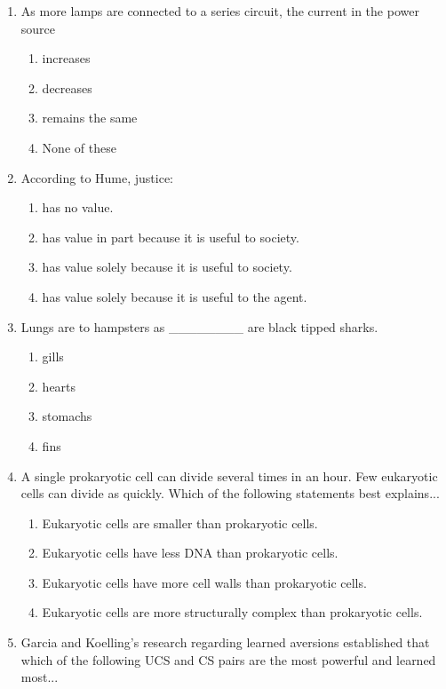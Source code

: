 \documentclass[12pt]{article}
\begin{document}
\begin{enumerate}[label=\arabic*.]
\begin{enumerate}[label=(\alph*)]
\end{enumerate}
\item As more lamps are connected to a series circuit, the current in the power source
\begin{enumerate}[label=(\alph*)]
    \item increases
    \item decreases
    \item remains the same
    \item None of these
\end{enumerate}
\item According to Hume, justice:
\begin{enumerate}[label=(\alph*)]
    \item has no value.
    \item has value in part because it is useful to society.
    \item has value solely because it is useful to society.
    \item has value solely because it is useful to the agent.
\end{enumerate}
\item Lungs are to hampsters as \_\_\_\_\_\_\_\_ are black tipped sharks.
\begin{enumerate}[label=(\alph*)]
    \item gills
    \item hearts
    \item stomachs
    \item fins
\end{enumerate}
\item A single prokaryotic cell can divide several times in an hour. Few eukaryotic cells can divide as quickly. Which of the following statements best explains...
\begin{enumerate}[label=(\alph*)]
    \item Eukaryotic cells are smaller than prokaryotic cells.
    \item Eukaryotic cells have less DNA than prokaryotic cells.
    \item Eukaryotic cells have more cell walls than prokaryotic cells.
    \item Eukaryotic cells are more structurally complex than prokaryotic cells.
\end{enumerate}
\item Garcia and Koelling's research regarding learned aversions established that which of the following UCS and CS pairs are the most powerful and learned most...
\begin{enumerate}[label=(\alph*)]

\end{enumerate}
\end{enumerate}
\end{document}

